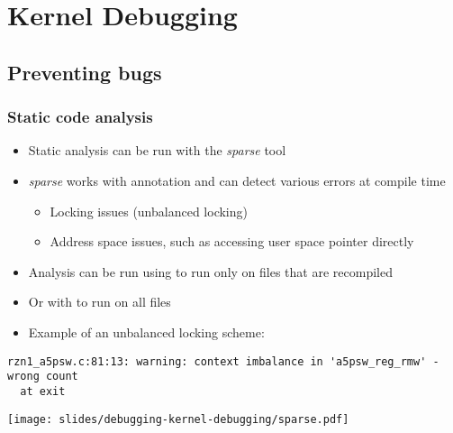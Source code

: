\section{Kernel Debugging}

\subsection{Preventing bugs}

\begin{frame}[fragile]
  \frametitle{Static code analysis}
  \begin{itemize}
    \item Static analysis can be run with the {\em sparse} tool
    \item {\em sparse} works with annotation and can detect various errors at
          compile time
    \begin{itemize}
      \item Locking issues (unbalanced locking)
      \item Address space issues, such as accessing user space pointer directly
    \end{itemize}
    \item Analysis can be run using  to run only on files that are
          recompiled
    \item Or with  to run on all files
    \item Example of an unbalanced locking scheme:
  \end{itemize}
  \begin{block}{}
    \begin{verbatim}
rzn1_a5psw.c:81:13: warning: context imbalance in 'a5psw_reg_rmw' - wrong count
  at exit
    \end{verbatim}
  \end{block}

  \vspace{0.5cm}
  \begin{center}
    \texttt{[image: slides/debugging-kernel-debugging/sparse.pdf]}
  \end{center}
\end{frame}

